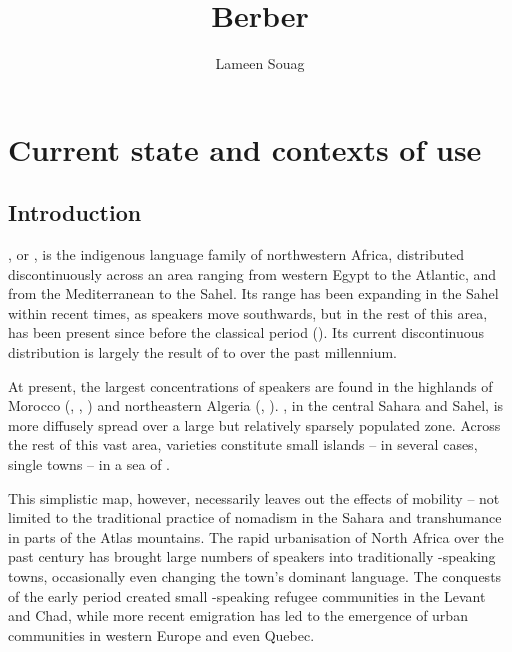 \documentclass[output=paper]{langsci/langscibook}
\author{Lameen Souag\affiliation{CNRS, LACITO}}
\title{Berber}
\begin{document}
\maketitle 
  


 \section{Current state and contexts of use}


 \subsection{Introduction}


, or , is the indigenous language family of northwestern Africa, distributed discontinuously across an area ranging from western Egypt to the Atlantic, and from the Mediterranean to the Sahel. Its range has been expanding in the Sahel within recent times, as  speakers move southwards, but in the rest of this area,  has been present since before the classical period (\citealt{MúrciaSánchez2010}). Its current discontinuous distribution is largely the result of  to  over the past millennium.

At present, the largest concentrations of  speakers are found in the highlands of Morocco (, , ) and northeastern Algeria (, ). , in the central Sahara and Sahel, is more diffusely spread over a large but relatively sparsely populated zone. Across the rest of this vast area,  varieties constitute small islands – in several cases, single towns – in a sea of .

This simplistic map, however, necessarily leaves out the effects of mobility – not limited to the traditional practice of nomadism in the Sahara and transhumance in parts of the Atlas mountains. The rapid urbanisation of North Africa over the past century has brought large numbers of  speakers into traditionally -speaking towns, occasionally even changing the town's dominant language. The conquests of the early  period created small -speaking refugee communities in the Levant and Chad, while more recent emigration has led to the emergence of urban  communities in western Europe and even Quebec.
\end{document}
